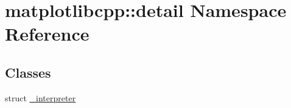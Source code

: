 \hypertarget{namespacematplotlibcpp_1_1detail}{}\section{matplotlibcpp\+:\+:detail Namespace Reference}
\label{namespacematplotlibcpp_1_1detail}
\subsection*{Classes}
\begin{DoxyCompactItemize}
\item 
struct \hyperlink{structmatplotlibcpp_1_1detail_1_1__interpreter}{\+\_\+interpreter}
\end{DoxyCompactItemize}
